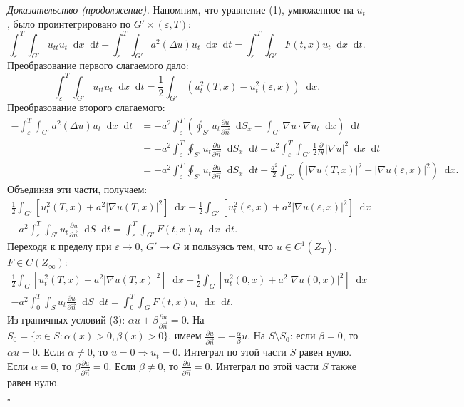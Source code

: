\documentclass[12pt, a4paper]{article}
\newcommand{\dd}{\mathop{}\!\mathrm{d}} %
\newenvironment{proof}[1][\proofname]{\par\noindent\textit{#1.}\quad}{\hfill$\square$}
\renewcommand{\proofname}{Доказательство}
\begin{document}
\begin{proof}[Доказательство (продолжение)]
Напомним, что уравнение (1), умноженное на $u_t$, было проинтегрировано по $G' \times (\varepsilon, T)$:
$$ \int_\varepsilon^T \int_{G'} u_{tt} u_t \dd x \dd t - \int_\varepsilon^T \int_{G'} a^2 (\Delta u) u_t \dd x \dd t = \int_\varepsilon^T \int_{G'} F(t,x) u_t \dd x \dd t. $$
Преобразование первого слагаемого дало:
$$ \int_\varepsilon^T \int_{G'} u_{tt} u_t \dd x \dd t = \frac{1}{2} \int_{G'} (u_t^2(T,x) - u_t^2(\varepsilon,x)) \dd x. $$
Преобразование второго слагаемого:
\begin{align*}
- \int_\varepsilon^T \int_{G'} a^2 (\Delta u) u_t \dd x \dd t &= - a^2 \int_\varepsilon^T \left( \oint_{S'} u_t \frac{\partial u}{\partial \vec{n}} \dd S_x - \int_{G'} \nabla u \cdot \nabla u_t \dd x \right) \dd t \\
&= - a^2 \int_\varepsilon^T \oint_{S'} u_t \frac{\partial u}{\partial \vec{n}} \dd S_x \dd t + a^2 \int_\varepsilon^T \int_{G'} \frac{1}{2} \frac{\partial}{\partial t} |\nabla u|^2 \dd x \dd t \\
&= - a^2 \int_\varepsilon^T \oint_{S'} u_t \frac{\partial u}{\partial \vec{n}} \dd S_x \dd t + \frac{a^2}{2} \int_{G'} (|\nabla u(T,x)|^2 - |\nabla u(\varepsilon,x)|^2) \dd x.
\end{align*}
Объединяя эти части, получаем:
\begin{multline*}
\frac{1}{2} \int_{G'} [u_t^2(T,x) + a^2 |\nabla u(T,x)|^2] \dd x - \frac{1}{2} \int_{G'} [u_t^2(\varepsilon,x) + a^2 |\nabla u(\varepsilon,x)|^2] \dd x \\
- a^2 \int_\varepsilon^T \int_{S'} u_t \frac{\partial u}{\partial \vec{n}} \dd S \dd t = \int_\varepsilon^T \int_{G'} F(t,x) u_t \dd x \dd t.
\end{multline*}
Переходя к пределу при $\varepsilon \to 0$, $G' \to G$ и пользуясь тем, что $u \in C^1(\bar{Z}_T)$, $F \in C(Z_\infty)$:
\begin{multline*}
\frac{1}{2} \int_G [u_t^2(T,x) + a^2 |\nabla u(T,x)|^2] \dd x - \frac{1}{2} \int_G [u_t^2(0,x) + a^2 |\nabla u(0,x)|^2] \dd x \\
- a^2 \int_0^T \int_S u_t \frac{\partial u}{\partial \vec{n}} \dd S \dd t = \int_0^T \int_G F(t,x) u_t \dd x \dd t.
\end{multline*}
Из граничных условий (3): $\alpha u + \beta \frac{\partial u}{\partial \vec{n}} = 0$.
На $S_0 = \{x \in S : \alpha(x)>0, \beta(x)>0\}$, имеем $\frac{\partial u}{\partial \vec{n}} = -\frac{\alpha}{\beta} u$.
На $S \setminus S_0$: если $\beta=0$, то $\alpha u=0$. Если $\alpha \neq 0$, то $u=0 \Rightarrow u_t=0$. Интеграл по этой части $S$ равен нулю. Если $\alpha=0$, то $\beta \frac{\partial u}{\partial \vec{n}}=0$. Если $\beta \neq 0$, то $\frac{\partial u}{\partial \vec{n}}=0$. Интеграл по этой части $S$ также равен нулю.

\end{proof}
\end{document}
